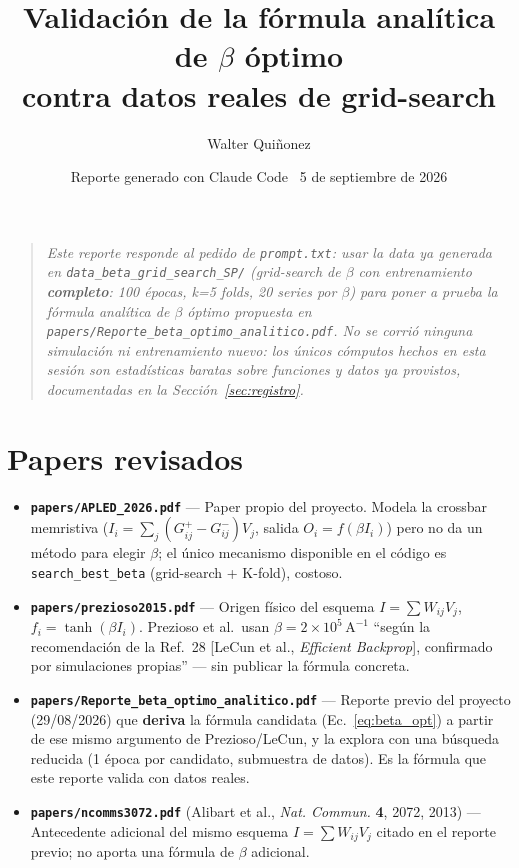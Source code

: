 \documentclass[11pt]{article}
\title{\textbf{Validación de la fórmula analítica de $\beta$ óptimo\\
contra datos reales de grid-search}}
\author{Walter Quiñonez}
\date{Reporte generado con Claude Code \textperiodcentered\ 5 de septiembre de 2026}
\begin{document}
\maketitle

\begin{quote}\itshape
Este reporte responde al pedido de \texttt{prompt.txt}: usar la data ya
generada en \texttt{data\_beta\_grid\_search\_SP/} (grid-search de $\beta$ con
entrenamiento \textbf{completo}: 100 épocas, k=5 folds, 20 series por
$\beta$) para poner a prueba la fórmula analítica de $\beta$ óptimo
propuesta en \texttt{papers/Reporte\_beta\_optimo\_analitico.pdf}. No se
corrió ninguna simulación ni entrenamiento nuevo: los únicos cómputos hechos
en esta sesión son estadísticas baratas sobre funciones y datos ya
provistos, documentadas en la Sección~\ref{sec:registro}.
\end{quote}

\tableofcontents

\section{Papers revisados}

\begin{itemize}
\item \textbf{\texttt{papers/APLED\_2026.pdf}} --- Paper propio del proyecto.
  Modela la crossbar memristiva ($I_i = \sum_j (G^+_{ij}-G^-_{ij})V_j$,
  salida $O_i=f(\beta I_i)$) pero no da un método para elegir $\beta$; el
  único mecanismo disponible en el código es \texttt{search\_best\_beta}
  (grid-search + K-fold), costoso.
\item \textbf{\texttt{papers/prezioso2015.pdf}} --- Origen físico del
  esquema $I=\sum W_{ij}V_j$, $f_i=\tanh(\beta I_i)$. Prezioso et al.\ usan
  $\beta=2\times10^{5}\,\mathrm{A}^{-1}$ ``según la recomendación de la
  Ref.~28 [LeCun et al., \emph{Efficient Backprop}], confirmado por
  simulaciones propias'' --- sin publicar la fórmula concreta.
\item \textbf{\texttt{papers/Reporte\_beta\_optimo\_analitico.pdf}} ---
  Reporte previo del proyecto (29/08/2026) que \textbf{deriva} la fórmula
  candidata (Ec.~\ref{eq:beta_opt}) a partir de ese mismo argumento de
  Prezioso/LeCun, y la explora con una búsqueda reducida (1 época por
  candidato, submuestra de datos). Es la fórmula que este reporte valida
  con datos reales.
\item \textbf{\texttt{papers/ncomms3072.pdf}} (Alibart et al., \emph{Nat.
  Commun.} \textbf{4}, 2072, 2013) --- Antecedente adicional del mismo
  esquema $I=\sum W_{ij}V_j$ citado en el reporte previo; no aporta una
  fórmula de $\beta$ adicional.
\end{itemize}
\end{document}
